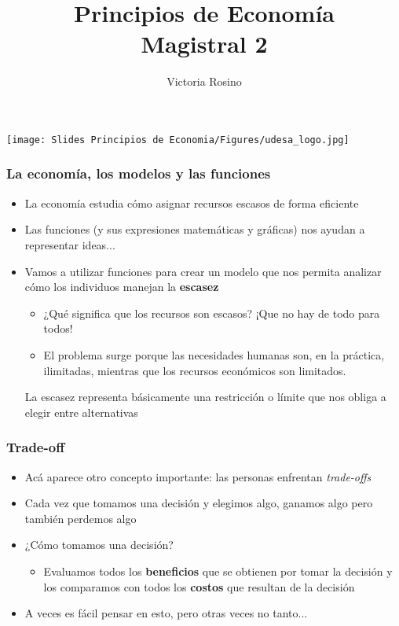 \documentclass{beamer}
\title[Principios de Economía]{Principios de Economía \vspace{4mm}
\\ Magistral 2}
\date{}
\author[Victoria Rosino]{Victoria Rosino}
\institute[]{Universidad de San Andrés}
\begin{document}
\begin{frame}
\vspace{0.4cm}
\titlepage
\centering
\vspace{-0.5cm}
\texttt{[image: Slides Principios de Economia/Figures/udesa\_logo.jpg]} 
\end{frame}


\begin{frame}
\frametitle{La economía, los modelos y las funciones}
\begin{itemize}
    \item La economía estudia cómo asignar recursos escasos de forma eficiente \vspace{2mm}
    \item Las funciones (y sus expresiones matemáticas y gráficas) nos ayudan a representar ideas... \vspace{2mm}
    \item Vamos a utilizar funciones para crear un modelo que nos permita analizar cómo los individuos manejan la \textbf{escasez} 
    \begin{itemize}
        \item ¿Qué significa que los recursos son escasos? ¡Que no hay de todo para todos! 
        \item El problema surge porque las necesidades humanas son, en la práctica, ilimitadas, mientras que los recursos económicos son limitados. 
    \end{itemize}
    \begin{boxB}
    La escasez representa básicamente una restricción o límite que nos obliga a elegir entre alternativas
    \end{boxB}
\end{itemize} 
\end{frame}

\begin{frame}
\frametitle{Trade-off}
\begin{itemize}
    \item Acá aparece otro concepto importante: las personas enfrentan \textit{trade-offs} \vspace{2mm}
    \item Cada vez que tomamos una decisión y elegimos algo, ganamos algo pero también perdemos algo \vspace{2mm}
    \item ¿Cómo tomamos una decisión? 
    \begin{itemize}
        \item Evaluamos todos los \textbf{beneficios} que se obtienen por tomar la decisión y los comparamos con todos los \textbf{costos} que resultan de la decisión
        \vspace{1mm}
    \end{itemize}
    \item A veces es fácil pensar en esto, pero otras veces no tanto...
\end{itemize} 
\end{frame}
\end{document}
